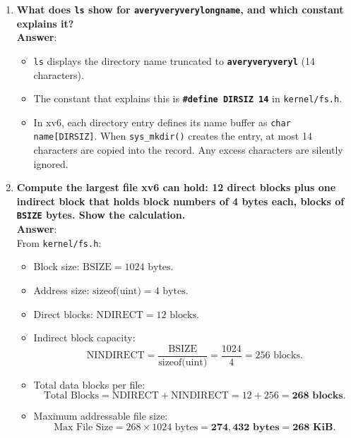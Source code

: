 \documentclass[12pt,a4paper]{article}
\begin{document}
\begin{enumerate}
    \item \textbf{What does \texttt{ls} show for \texttt{averyveryverylongname}, and which constant explains it?} \\
    \textbf{Answer}:
    \begin{itemize}
        \item \texttt{ls} displays the directory name truncated to \textbf{\texttt{averyveryveryl}} (14 characters).
        \item The constant that explains this is \textbf{\texttt{\#define DIRSIZ 14}} in \texttt{kernel/fs.h}.
        \item In xv6, each directory entry defines its name buffer as \texttt{char name[DIRSIZ]}. When \texttt{sys\_mkdir()} creates the entry, at most 14 characters are copied into the record. Any excess characters are silently ignored.
    \end{itemize}

    \item \textbf{Compute the largest file xv6 can hold: 12 direct blocks plus one indirect block that holds block numbers of 4 bytes each, blocks of \texttt{BSIZE} bytes. Show the calculation.} \\
    \textbf{Answer}: \\
    From \texttt{kernel/fs.h}:
    \begin{itemize}
        \item Block size: $\text{BSIZE} = 1024\text{ bytes}$.
        \item Address size: $\text{sizeof(uint)} = 4\text{ bytes}$.
        \item Direct blocks: $\text{NDIRECT} = 12\text{ blocks}$.
        \item Indirect block capacity:
        \[
        \text{NINDIRECT} = \frac{\text{BSIZE}}{\text{sizeof(uint)}} = \frac{1024}{4} = 256\text{ blocks}.
        \]
        \item Total data blocks per file:
        \[
        \text{Total Blocks} = \text{NDIRECT} + \text{NINDIRECT} = 12 + 256 = \mathbf{268\text{ blocks}}.
        \]
        \item Maximum addressable file size:
        \[
        \text{Max File Size} = 268 \times 1024\text{ bytes} = \mathbf{274,432\text{ bytes}} = \mathbf{268\text{ KiB}}.
        \]
    \end{itemize}


\end{enumerate}
\end{document}
